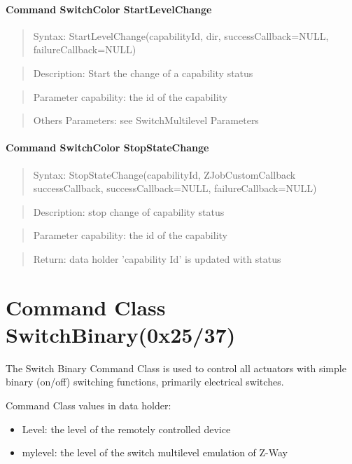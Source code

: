 \paragraph {Command SwitchColor StartLevelChange}
\begin{quote} Syntax: StartLevelChange(capabilityId, dir, successCallback=NULL, failureCallback=NULL)\end{quote}
\begin{quote} Description: Start the change of a capability status\end{quote}
\begin{quote} Parameter capability: the id of the capability\end{quote}
\begin{quote} Others Parameters: see SwitchMultilevel Parameters\end{quote} 

\paragraph {Command SwitchColor StopStateChange}
\begin{quote} Syntax: StopStateChange(capabilityId, ZJobCustomCallback successCallback, successCallback=NULL, failureCallback=NULL)\end{quote}
\begin{quote} Description: stop change of capability status\end{quote}
\begin{quote} Parameter capability: the id of the capability\end{quote}
\begin{quote} Return: data holder 'capability Id' is updated with status \end{quote}




\section{Command Class SwitchBinary(0x25/37)}

The Switch Binary Command Class is used to control all actuators with simple binary (on/off) switching functions, primarily electrical switches. 

Command Class values in data holder:
\begin{itemize}
\item Level: the level of the remotely controlled device
\item mylevel:  the level of the switch multilevel emulation of Z-Way
\end{itemize}

